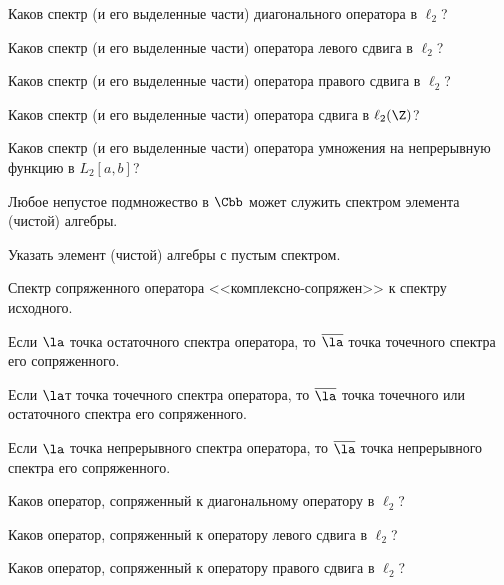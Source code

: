 \documentclass[a4paper]{article}
\begin{document}
\begin{nums}{-1}
\item Каков спектр (и его выделенные части) диагонального оператора в $\ell_2$?
\item Каков спектр (и его выделенные части) оператора левого сдвига в $\ell_2$?
\item Каков спектр (и его выделенные части) оператора правого сдвига в $\ell_2$?
\item Каков спектр (и его выделенные части) оператора сдвига в $\ell_2(\Z)$?
\item Каков спектр (и его выделенные части) оператора умножения на непрерывную
функцию в $L_2[a,b]$?
\item Любое непустое подмножество в $\Cbb$ может служить спектром элемента (чистой) алгебры.

\item Указать элемент (чистой) алгебры с пустым спектром.
\item Спектр сопряженного оператора <<комплексно-сопряжен>> к спектру исходного.

\item Если $\la$ точка остаточного спектра оператора, то $\overline{\la}$ точка точечного
спектра его сопряженного.
\item Если $\la$т точка точечного спектра оператора, то $\overline{\la}$ точка точечного или
остаточного спектра его сопряженного.
\item Если $\la$ точка непрерывного спектра оператора, то $\overline{\la}$ точка
непрерывного спектра его сопряженного.
\item Каков оператор, сопряженный к диагональному оператору в $\ell_2$?
\item Каков оператор, сопряженный к оператору левого сдвига в $\ell_2$?
\item Каков оператор, сопряженный к оператору правого сдвига в $\ell_2$?


\end{nums}
\end{document}
